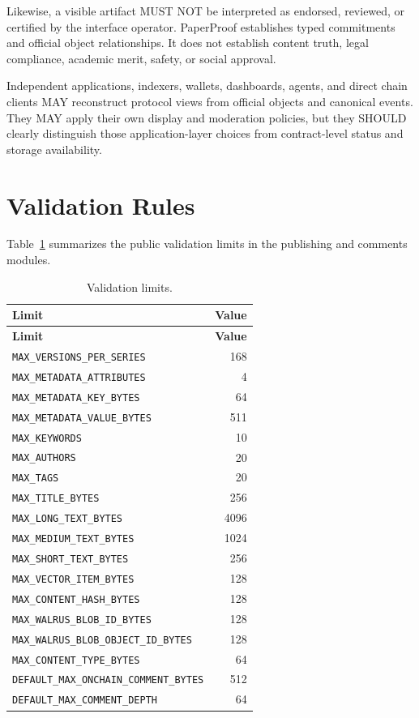 \documentclass[11pt]{article}
\newcommand{\code}[1]{\texttt{#1}}
\begin{document}
Likewise, a visible artifact MUST NOT be interpreted as endorsed, reviewed, or
certified by the interface operator. PaperProof establishes typed commitments
and official object relationships. It does not establish content truth, legal
compliance, academic merit, safety, or social approval.

Independent applications, indexers, wallets, dashboards, agents, and direct
chain clients MAY reconstruct protocol views from official objects and
canonical events. They MAY apply their own display and moderation policies, but
they SHOULD clearly distinguish those application-layer choices from
contract-level status and storage availability.

\section{Validation Rules}

Table~\ref{tab:validation-limits} summarizes the public validation limits in the publishing and comments modules.

\begin{longtable}{lr}
\caption{Validation limits.}
\label{tab:validation-limits}\\
\toprule
\textbf{Limit} & \textbf{Value} \\
\midrule
\endfirsthead
\toprule
\textbf{Limit} & \textbf{Value} \\
\midrule
\endhead
\code{MAX\_VERSIONS\_PER\_SERIES} & 168 \\
\code{MAX\_METADATA\_ATTRIBUTES} & 4 \\
\code{MAX\_METADATA\_KEY\_BYTES} & 64 \\
\code{MAX\_METADATA\_VALUE\_BYTES} & 511 \\
\code{MAX\_KEYWORDS} & 10 \\
\code{MAX\_AUTHORS} & 20 \\
\code{MAX\_TAGS} & 20 \\
\code{MAX\_TITLE\_BYTES} & 256 \\
\code{MAX\_LONG\_TEXT\_BYTES} & 4096 \\
\code{MAX\_MEDIUM\_TEXT\_BYTES} & 1024 \\
\code{MAX\_SHORT\_TEXT\_BYTES} & 256 \\
\code{MAX\_VECTOR\_ITEM\_BYTES} & 128 \\
\code{MAX\_CONTENT\_HASH\_BYTES} & 128 \\
\code{MAX\_WALRUS\_BLOB\_ID\_BYTES} & 128 \\
\code{MAX\_WALRUS\_BLOB\_OBJECT\_ID\_BYTES} & 128 \\
\code{MAX\_CONTENT\_TYPE\_BYTES} & 64 \\
\code{DEFAULT\_MAX\_ONCHAIN\_COMMENT\_BYTES} & 512 \\
\code{DEFAULT\_MAX\_COMMENT\_DEPTH} & 64 \\
\bottomrule
\end{longtable}
\end{document}
